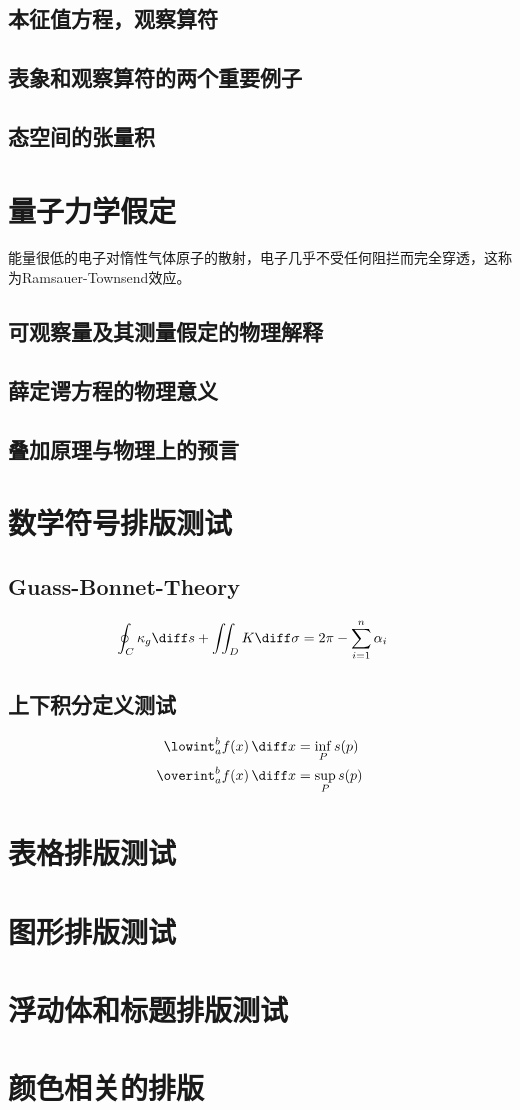 \subsection{本征值方程，观察算符}%
\subsection{表象和观察算符的两个重要例子}
\subsection{态空间的张量积}
\section{量子力学假定}
能量很低的电子对惰性气体原子的散射，电子几乎不受任何阻拦而完全穿透，这称为Ramsauer-Townsend效应。\cite{Zengshu}
\subsection{可观察量及其测量假定的物理解释}
\subsection{薛定谔方程的物理意义}
\subsection{叠加原理与物理上的预言}
\section{数学符号排版测试}
\subsection{Guass-Bonnet-Theory}
\begin{align}
\oint_C \kappa_g \diff s+\iint_D K \diff \sigma&=2\pi-\sum_{i=1}^n\alpha_i
\end{align}
\subsection{上下积分定义测试}
\begin{align}
\lowint_a^b f(x)\, \diff x&=\inf_P s(p)\\
\overint_a^b f(x)\, \diff x&=\sup_P s(p)
\end{align}
\section{表格排版测试}

\section{图形排版测试}

\section{浮动体和标题排版测试}

\section{颜色相关的排版}
%


